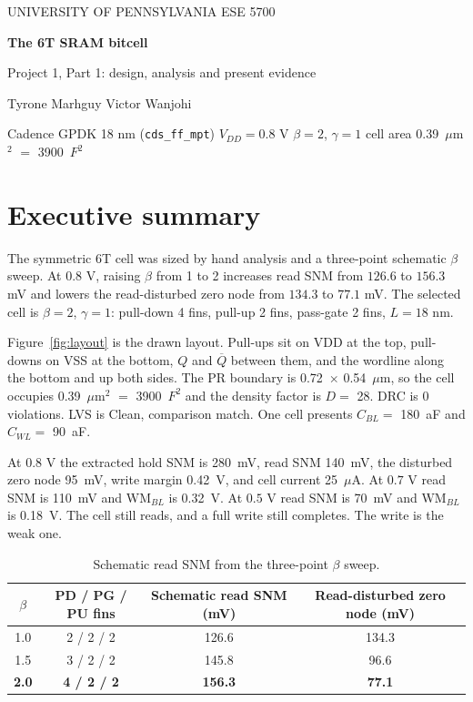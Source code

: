 \documentclass[10pt,letterpaper]{article}
\newcommand{\cellW}{0.72}           %
\newcommand{\cellH}{0.54}           %
\newcommand{\cellAreaUm}{0.39}      %
\newcommand{\cellAreaF}{3900}       %
\newcommand{\densityD}{28}          %
\newcommand{\drcResult}{0 violations} %
\newcommand{\lvsResult}{Clean, comparison match}
\newcommand{\cBL}{180}              %
\newcommand{\cWL}{90}               %
\newcommand{\snmHold}{280}          %
\newcommand{\snmReadPL}{140}        %
\newcommand{\vZeroPL}{95}           %
\newcommand{\wmBL}{0.42}            %
\newcommand{\iCell}{25}             %
\newcommand{\snmReadSeven}{110}\newcommand{\wmSeven}{0.32}
\newcommand{\snmReadFive}{70}\newcommand{\wmFive}{0.18}
\begin{document}
\begin{center}
{\small UNIVERSITY OF PENNSYLVANIA \quad ESE 5700}\par\vspace{8pt}
{\Huge\bfseries The 6T SRAM bitcell}\par\vspace{4pt}
{\large Project 1, Part 1: design, analysis and present evidence}\par\vspace{10pt}
Tyrone Marhguy \quad\textbullet\quad Victor Wanjohi\par\vspace{8pt}
\colorbox{pale}{\parbox{.93\linewidth}{\small\centering Cadence GPDK 18 nm (\texttt{cds\_ff\_mpt}) \quad $V_{DD}=0.8$ V \quad $\beta=2$, $\gamma=1$ \quad cell area \cellAreaUm\ $\mu$m$^2$ $=$ \cellAreaF\ $F^2$}}
\end{center}

\section*{Executive summary}
The symmetric 6T cell was sized by hand analysis and a three-point schematic $\beta$ sweep. At $0.8$ V, raising $\beta$ from 1 to 2 increases read SNM from $126.6$ to $156.3$ mV and lowers the read-disturbed zero node from $134.3$ to $77.1$ mV. The selected cell is $\beta=2$, $\gamma=1$: pull-down 4 fins, pull-up 2 fins, pass-gate 2 fins, $L=18$ nm.

Figure~\ref{fig:layout} is the drawn layout. Pull-ups sit on VDD at the top, pull-downs on VSS at the bottom, $Q$ and $\overline Q$ between them, and the wordline along the bottom and up both sides. The PR boundary is \cellW\ $\times$ \cellH\ $\mu$m, so the cell occupies \cellAreaUm\ $\mu$m$^2$ $=$ \cellAreaF\ $F^2$ and the density factor is $D=$ \densityD. DRC is \drcResult. LVS is \lvsResult. One cell presents $C_{BL}=$ \cBL\ aF and $C_{WL}=$ \cWL\ aF.

At $0.8$ V the extracted hold SNM is \snmHold\ mV, read SNM \snmReadPL\ mV, the disturbed zero node \vZeroPL\ mV, write margin \wmBL\ V, and cell current \iCell\ $\mu$A. At $0.7$ V read SNM is \snmReadSeven\ mV and $\mathrm{WM}_{BL}$ is \wmSeven\ V. At $0.5$ V read SNM is \snmReadFive\ mV and $\mathrm{WM}_{BL}$ is \wmFive\ V. The cell still reads, and a full write still completes. The write is the weak one.

\begin{table}[h]
\centering\caption{Schematic read SNM from the three-point $\beta$ sweep.}
\begin{tabular}{@{}cccc@{}}\toprule
$\beta$ & PD / PG / PU fins & Schematic read SNM (mV) & Read-disturbed zero node (mV) \\\midrule
1.0 & 2 / 2 / 2 & 126.6 & 134.3 \\
1.5 & 3 / 2 / 2 & 145.8 & 96.6 \\
\textbf{2.0} & \textbf{4 / 2 / 2} & \textbf{156.3} & \textbf{77.1} \\\bottomrule
\end{tabular}
\end{table}
\end{document}
